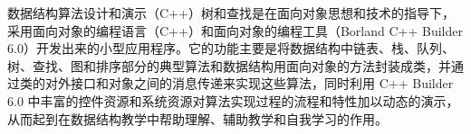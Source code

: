 \begin{upcabstractcn}
数据结构算法设计和演示（C++）树和查找是在面向对象思想和技术的指导下，采用面向对象的编程语言（C++）和面向对象的编程工具（Borland C++ Builder 6.0）开发出来的小型应用程序。它的功能主要是将数据结构中链表、栈、队列、树、查找、图和排序部分的典型算法和数据结构用面向对象的方法封装成类，并通过类的对外接口和对象之间的消息传递来实现这些算法，同时利用 C++ Builder 6.0 中丰富的控件资源和系统资源对算法实现过程的流程和特性加以动态的演示，从而起到在数据结构教学中帮助理解、辅助教学和自我学习的作用。
\end{upcabstractcn}
